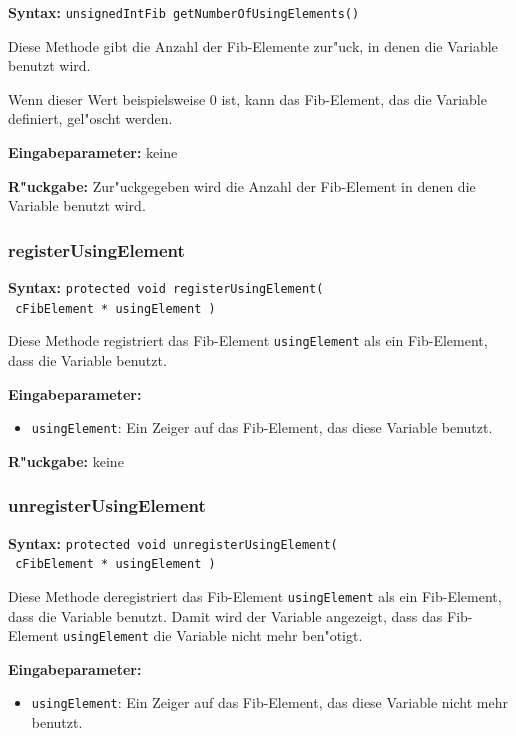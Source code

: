 \textbf{Syntax:} \verb|unsignedIntFib getNumberOfUsingElements()|

\bigskip\noindent
Diese Methode gibt die Anzahl der Fib-Elemente zur"uck, in denen die Variable benutzt wird.

Wenn dieser Wert beispielsweise 0 ist, kann das Fib-Element, das die Variable definiert, gel"oscht werden.

\bigskip\noindent
\textbf{Eingabeparameter:} keine

\bigskip\noindent
\textbf{R"uckgabe:} Zur"uckgegeben wird die Anzahl der Fib-Element in denen die Variable benutzt wird.


\subsubsection{registerUsingElement}

\textbf{Syntax:} \verb|protected void registerUsingElement(| \\\verb| cFibElement * usingElement )|

\bigskip\noindent
Diese Methode registriert das Fib-Element \verb|usingElement| als ein Fib-Element, dass die Variable benutzt.

\bigskip\noindent
\textbf{Eingabeparameter:}
\begin{itemize}
 \item \verb|usingElement|: Ein Zeiger auf das Fib-Element, das diese Variable benutzt.
\end{itemize}

\bigskip\noindent
\textbf{R"uckgabe:} keine


\subsubsection{unregisterUsingElement}

\textbf{Syntax:} \verb|protected void unregisterUsingElement(| \\\verb| cFibElement * usingElement )|

\bigskip\noindent
Diese Methode deregistriert das Fib-Element \verb|usingElement| als ein Fib-Element, dass die Variable benutzt. Damit wird der Variable angezeigt, dass das Fib-Element \verb|usingElement| die Variable nicht mehr ben"otigt.

\bigskip\noindent
\textbf{Eingabeparameter:}
\begin{itemize}
 \item \verb|usingElement|: Ein Zeiger auf das Fib-Element, das diese Variable nicht mehr benutzt.
\end{itemize}

